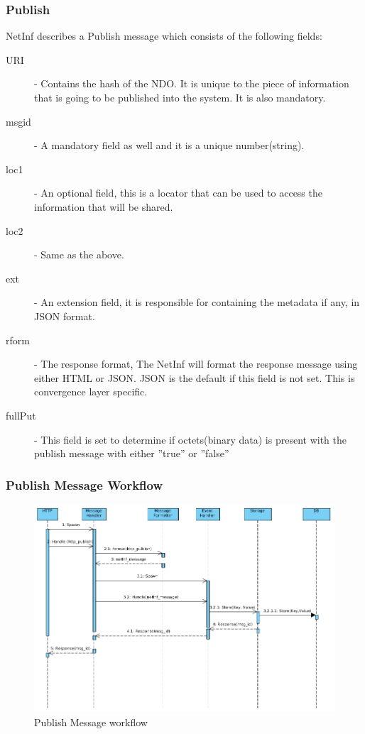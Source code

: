 \subsubsection{Publish}

NetInf describes a Publish message which consists of the following fields:

\begin{description}
\item[URI]  - Contains the hash of the NDO. It is unique to the piece of information that is going to be published into the system. It is also mandatory.
\item[msgid] - A mandatory field as well and it is a unique number(string). 
\item[loc1] - An optional field, this is a locator that can be used to access the information that will be shared.
\item[loc2] - Same as the above.
\item[ext] - An extension field, it is responsible for containing the metadata if any, in JSON format.
\item[rform] - The response format, The NetInf will format the response message using either HTML or JSON. JSON is the default if this field is not set. This is convergence layer specific.
\item[fullPut] - This field is set to determine if octets(binary data) is present with the publish message with either ''true'' or ''false''
\end{description}

\subsubsection{Publish Message Workflow}

\begin{figure}[H]
	\centering
\centerline{\includegraphics[width=1.2\textwidth]{./img/seq_pub.png}}
\caption{Publish Message workflow}
\label{fig:publishfig}
\end{figure}

